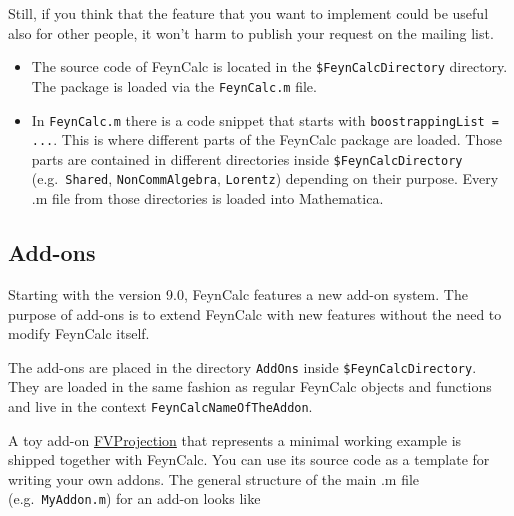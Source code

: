 \documentclass[../FeynCalcManual.tex]{subfiles}
\begin{document}
Still, if you think that the feature that you want to implement could be
useful also for other people, it won't harm to publish your request on
the mailing list.

\begin{itemize}
\tightlist
\item
  The source code of FeynCalc is located in the
  \texttt{\$FeynCalcDirectory} directory. The package is loaded via the
  \texttt{FeynCalc.m} file.
\item
  In \texttt{FeynCalc.m} there is a code snippet that starts with
  \texttt{boostrappingList = ...}. This is where different parts of the
  FeynCalc package are loaded. Those parts are contained in different
  directories inside \texttt{\$FeynCalcDirectory} (e.g.~\texttt{Shared},
  \texttt{NonCommAlgebra}, \texttt{Lorentz}) depending on their purpose.
  Every .m file from those directories is loaded into Mathematica.
\end{itemize}

\hypertarget{add-ons}{%
\subsection{Add-ons}\label{add-ons}}

Starting with the version 9.0, FeynCalc features a new add-on system.
The purpose of add-ons is to extend FeynCalc with new features without
the need to modify FeynCalc itself.

The add-ons are placed in the directory \texttt{AddOns} inside
\texttt{\$FeynCalcDirectory}. They are loaded in the same fashion as
regular FeynCalc objects and functions and live in the context
\texttt{FeynCalc\textasciigrave NameOfTheAddon\textasciigrave }.

A toy add-on
\href{https://github.com/FeynCalc/feyncalc/tree/master/FeynCalc/AddOns/FVProjection}{FVProjection}
that represents a minimal working example is shipped together with
FeynCalc. You can use its source code as a template for writing your own
addons. The general structure of the main .m file
(e.g.~\texttt{MyAddon.m}) for an add-on looks like
\end{document}
